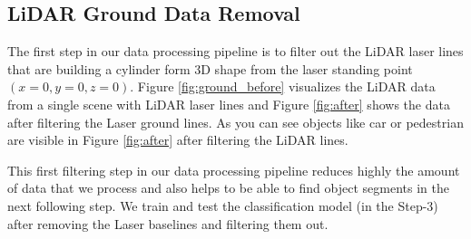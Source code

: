 %
%
%







\subsection{LiDAR Ground Data Removal}
%

The first step in our data processing pipeline is to filter out the LiDAR laser lines that are building a cylinder form 3D shape from the laser standing point $(x=0, y=0, z=0)$. Figure \ref{fig:ground_before} visualizes the LiDAR data from a single scene with LiDAR laser lines and Figure \ref{fig:after} shows the data after filtering the Laser ground lines. As you can see objects like car or pedestrian are visible in Figure \ref{fig:after} after filtering the LiDAR lines.

This first filtering step in our data processing pipeline reduces highly the amount of data that we process and also helps to be able to find object segments in the next following step.
We train and test the classification model (in the Step-3) after removing the Laser baselines and filtering them out.


